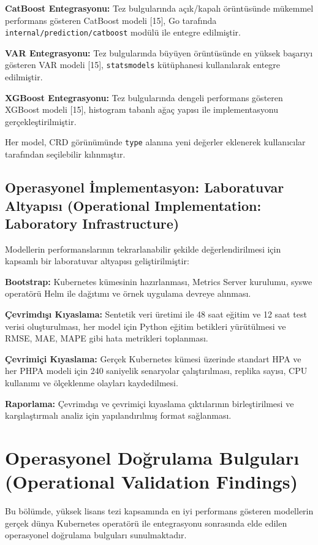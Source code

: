 \documentclass[12pt,a4paper]{article}
\begin{document}
\textbf{CatBoost Entegrasyonu:} Tez bulgularında açık/kapalı örüntüsünde mükemmel performans gösteren CatBoost modeli [15], Go tarafında \texttt{internal/prediction/catboost} modülü ile entegre edilmiştir.

\textbf{VAR Entegrasyonu:} Tez bulgularında büyüyen örüntüsünde en yüksek başarıyı gösteren VAR modeli [15], \texttt{statsmodels} kütüphanesi kullanılarak entegre edilmiştir.

\textbf{XGBoost Entegrasyonu:} Tez bulgularında dengeli performans gösteren XGBoost modeli [15], histogram tabanlı ağaç yapısı ile implementasyonu gerçekleştirilmiştir.

Her model, CRD görünümünde \texttt{type} alanına yeni değerler eklenerek kullanıcılar tarafından seçilebilir kılınmıştır.

\subsection{Operasyonel İmplementasyon: Laboratuvar Altyapısı (Operational Implementation: Laboratory Infrastructure)}

Modellerin performanslarının tekrarlanabilir şekilde değerlendirilmesi için kapsamlı bir laboratuvar altyapısı geliştirilmiştir:

\textbf{Bootstrap:} Kubernetes kümesinin hazırlanması, Metrics Server kurulumu, syswe operatörü Helm ile dağıtımı ve örnek uygulama devreye alınması.

\textbf{Çevrimdışı Kıyaslama:} Sentetik veri üretimi ile 48 saat eğitim ve 12 saat test verisi oluşturulması, her model için Python eğitim betikleri yürütülmesi ve RMSE, MAE, MAPE gibi hata metrikleri toplanması.

\textbf{Çevrimiçi Kıyaslama:} Gerçek Kubernetes kümesi üzerinde standart HPA ve her PHPA modeli için 240 saniyelik senaryolar çalıştırılması, replika sayısı, CPU kullanımı ve ölçeklenme olayları kaydedilmesi.

\textbf{Raporlama:} Çevrimdışı ve çevrimiçi kıyaslama çıktılarının birleştirilmesi ve karşılaştırmalı analiz için yapılandırılmış format sağlanması.

\section{Operasyonel Doğrulama Bulguları (Operational Validation Findings)}

Bu bölümde, yüksek lisans tezi kapsamında en iyi performans gösteren modellerin gerçek dünya Kubernetes operatörü ile entegrasyonu sonrasında elde edilen operasyonel doğrulama bulguları sunulmaktadır.
\end{document}
